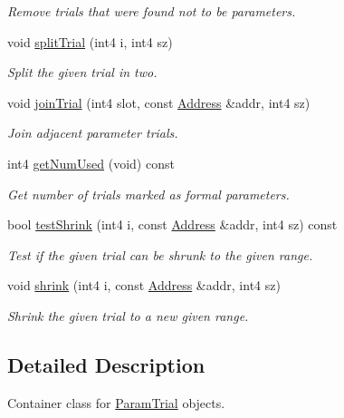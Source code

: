 \begin{DoxyCompactItemize}
\begin{DoxyCompactList}\small\item\em Remove trials that were found not to be parameters. \end{DoxyCompactList}\item 
void \mbox{\hyperlink{class_param_active_add969ad5cdac4ac6dab2bd7e6b7b3ca5}{split\+Trial}} (int4 i, int4 sz)
\begin{DoxyCompactList}\small\item\em Split the given trial in two. \end{DoxyCompactList}\item 
void \mbox{\hyperlink{class_param_active_a593685d8f2f13f34e5c48f1f363c793d}{join\+Trial}} (int4 slot, const \mbox{\hyperlink{class_address}{Address}} \&addr, int4 sz)
\begin{DoxyCompactList}\small\item\em Join adjacent parameter trials. \end{DoxyCompactList}\item 
int4 \mbox{\hyperlink{class_param_active_a9f9fb238c57992903f10a7ccc2ca45ff}{get\+Num\+Used}} (void) const
\begin{DoxyCompactList}\small\item\em Get number of trials marked as formal parameters. \end{DoxyCompactList}\item 
bool \mbox{\hyperlink{class_param_active_aa8aaa478177b4ce6d94c4a988059ab3f}{test\+Shrink}} (int4 i, const \mbox{\hyperlink{class_address}{Address}} \&addr, int4 sz) const
\begin{DoxyCompactList}\small\item\em Test if the given trial can be shrunk to the given range. \end{DoxyCompactList}\item 
void \mbox{\hyperlink{class_param_active_abce147faf761497f43582dbed22b57c0}{shrink}} (int4 i, const \mbox{\hyperlink{class_address}{Address}} \&addr, int4 sz)
\begin{DoxyCompactList}\small\item\em Shrink the given trial to a new given range. \end{DoxyCompactList}\end{DoxyCompactItemize}


\subsection{Detailed Description}
Container class for \mbox{\hyperlink{class_param_trial}{Param\+Trial}} objects. 

